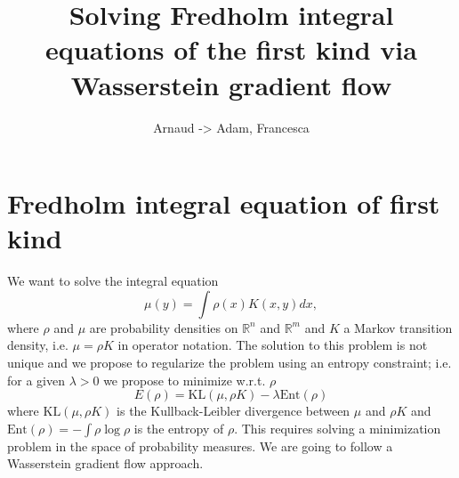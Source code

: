 \documentclass[a4paper]{article}
\title{Solving Fredholm integral equations of the first kind via Wasserstein gradient flow}
\author{Arnaud -> Adam, Francesca }
\date{ }
\begin{document}
\maketitle

\section{Fredholm integral equation of first kind}

We want to solve the integral equation
\[
\mu(y)=\int\rho\left(x\right)K(x,y)dx,
\]
where $\rho$ and $\mu$ are probability densities on $\mathbb{R}^{n}$ and $\mathbb{R}^{m}$ and $K$ a Markov transition density, i.e. $\mu=\rho K$ in operator notation. The solution to this problem is not unique and we propose to regularize the problem using an entropy constraint; i.e. for a given $\lambda>0$ we propose to minimize w.r.t. $\rho$
\[
E(\rho)=\text{{KL}}(\mu,\rho K)-\lambda\text{{Ent}}(\rho)
\]
where 
$\text{{KL}}(\mu,\rho K)$ is the Kullback-Leibler divergence between $\mu$ and $\rho K$ and $\text{{Ent}}(\rho)=-\int\rho\log\rho$ is the entropy of $\rho$.
This requires solving a minimization problem in the space of probability measures. We are going to follow a Wasserstein gradient flow approach.
\end{document}
